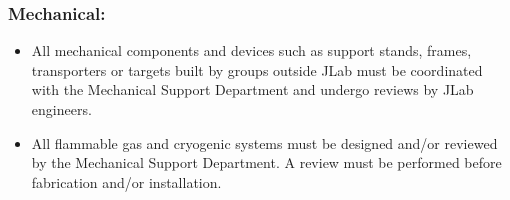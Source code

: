 \subsubsection*{Mechanical:}

\begin{itemize}

\item All mechanical components and devices such as support stands, frames, transporters or 
targets built by groups outside JLab must be coordinated with the Mechanical Support 
Department and undergo reviews by JLab engineers.

\item All flammable gas and cryogenic systems must be designed and/or reviewed by the 
Mechanical Support Department. A review must be performed before fabrication and/or 
installation.

\end{itemize}
